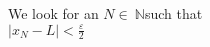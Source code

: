 \documentclass[preview]{standalone}
\begin{document}
\begin{center}
We look for an $N$$\in\:$$\mathbb{N}$such that \\$|x_N - L| <$$\frac{\varepsilon}{2}$
\end{center}
\end{document}
